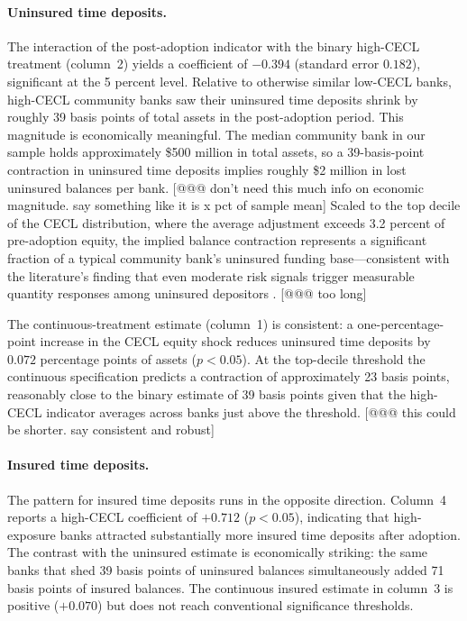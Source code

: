 \paragraph{Uninsured time deposits.}
The interaction of the post-adoption indicator with the binary high-CECL treatment
(column~2) yields a coefficient of $-0.394$ (standard error $0.182$), significant
at the 5 percent level.  Relative to otherwise similar low-CECL banks, high-CECL
community banks saw their uninsured time deposits shrink by roughly 39 basis
points of total assets in the post-adoption period.  This magnitude is
economically meaningful. The median community bank in our sample holds
approximately \$500 million in total assets, so a 39-basis-point contraction in
uninsured time deposits implies roughly \$2 million in lost uninsured balances per
bank. [@@@ don't need this much info on economic magnitude. say something like it is x pct of sample mean]  Scaled to the top decile of the CECL distribution, where the average
adjustment exceeds 3.2 percent of pre-adoption equity, the implied balance
contraction represents a significant fraction of a typical community bank's
uninsured funding base---consistent with the literature's finding that even
moderate risk signals trigger measurable quantity responses among uninsured
depositors \citep{martinez2001depositors, maechler2006dynamic}. [@@@ too long]

The continuous-treatment estimate (column~1) is consistent: a
one-percentage-point increase in the CECL equity shock reduces uninsured time
deposits by $0.072$ percentage points of assets ($p < 0.05$).  At the top-decile
threshold the continuous specification predicts a contraction of approximately 23
basis points, reasonably close to the binary estimate of 39 basis points given
that the high-CECL indicator averages across banks just above the threshold. [@@@ this could be shorter. say consistent and robust]

\paragraph{Insured time deposits.}
The pattern for insured time deposits runs in the opposite direction.  Column~4
reports a high-CECL coefficient of $+0.712$ ($p < 0.05$), indicating that
high-exposure banks attracted substantially more insured time deposits after
adoption.  The contrast with the uninsured estimate is economically striking: the
same banks that shed 39 basis points of uninsured balances simultaneously added
71 basis points of insured balances.  The continuous insured estimate in column~3
is positive ($+0.070$) but does not reach conventional significance thresholds.

